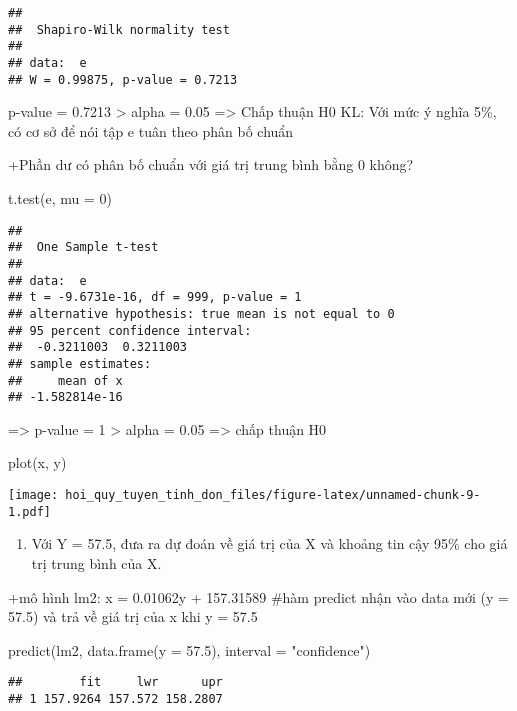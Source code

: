 \documentclass[
]{article}
\newenvironment{Shaded}{\begin{snugshade}}{\end{snugshade}}
\newcommand{\AttributeTok}[1]{\textcolor[rgb]{0.77,0.63,0.00}{#1}}
\newcommand{\DecValTok}[1]{\textcolor[rgb]{0.00,0.00,0.81}{#1}}
\newcommand{\FloatTok}[1]{\textcolor[rgb]{0.00,0.00,0.81}{#1}}
\newcommand{\FunctionTok}[1]{\textcolor[rgb]{0.00,0.00,0.00}{#1}}
\newcommand{\NormalTok}[1]{#1}
\newcommand{\StringTok}[1]{\textcolor[rgb]{0.31,0.60,0.02}{#1}}
\providecommand{\tightlist}{%
  \setlength{\itemsep}{0pt}\setlength{\parskip}{0pt}}
\begin{document}
\begin{verbatim}
## 
##  Shapiro-Wilk normality test
## 
## data:  e
## W = 0.99875, p-value = 0.7213
\end{verbatim}

p-value = 0.7213 \textgreater{} alpha = 0.05 =\textgreater{} Chấp thuận
H0 KL: Với mức ý nghĩa 5\%, có cơ sở để nói tập e tuân theo phân bố
chuẩn

+Phần dư có phân bố chuẩn với giá trị trung bình bằng 0 không?

\begin{Shaded}
\begin{Highlighting}[]
\FunctionTok{t.test}\NormalTok{(e, }\AttributeTok{mu =} \DecValTok{0}\NormalTok{)}
\end{Highlighting}
\end{Shaded}

\begin{verbatim}
## 
##  One Sample t-test
## 
## data:  e
## t = -9.6731e-16, df = 999, p-value = 1
## alternative hypothesis: true mean is not equal to 0
## 95 percent confidence interval:
##  -0.3211003  0.3211003
## sample estimates:
##     mean of x 
## -1.582814e-16
\end{verbatim}

=\textgreater{} p-value = 1 \textgreater{} alpha = 0.05 =\textgreater{}
chấp thuận H0

\begin{Shaded}
\begin{Highlighting}[]
\FunctionTok{plot}\NormalTok{(x, y)}
\end{Highlighting}
\end{Shaded}

\texttt{[image: hoi\_quy\_tuyen\_tinh\_don\_files/figure-latex/unnamed-chunk-9-1.pdf]}

\begin{enumerate}
\def\labelenumi{\alph{enumi}.}
\setcounter{enumi}{2}
\tightlist
\item
  Với Y = 57.5, đưa ra dự đoán về giá trị của X và khoảng tin cậy 95\%
  cho giá trị trung bình của X.
\end{enumerate}

+mô hình lm2: x = 0.01062y + 157.31589 \#hàm predict nhận vào data mới
(y = 57.5) và trả về giá trị của x khi y = 57.5

\begin{Shaded}
\begin{Highlighting}[]
\FunctionTok{predict}\NormalTok{(lm2, }\FunctionTok{data.frame}\NormalTok{(}\AttributeTok{y =} \FloatTok{57.5}\NormalTok{), }\AttributeTok{interval =} \StringTok{"confidence"}\NormalTok{)}
\end{Highlighting}
\end{Shaded}

\begin{verbatim}
##        fit     lwr      upr
## 1 157.9264 157.572 158.2807
\end{verbatim}
\end{document}
